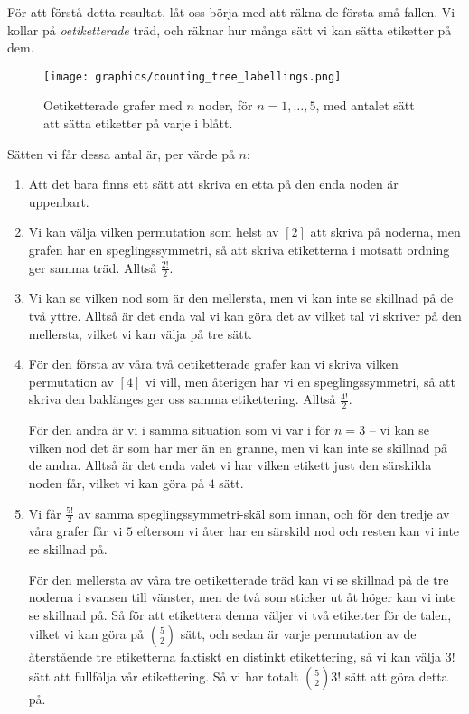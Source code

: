 \documentclass[nobib]{tufte-handout}
\begin{document}
För att förstå detta resultat, låt oss börja med att räkna de första små fallen. Vi kollar på \emph{oetiketterade} träd, och räknar hur många sätt vi kan sätta etiketter på dem.

\begin{figure}
    \centering
    \texttt{[image: graphics/counting\_tree\_labellings.png]}
    \caption{Oetiketterade grafer med $n$ noder, för $n = 1,\ldots,5$, med antalet sätt att sätta etiketter på varje i blått.}
\end{figure}

Sätten vi får dessa antal är, per värde på $n$:
\begin{enumerate}
    \item Att det bara finns ett sätt att skriva en etta på den enda noden är uppenbart.
    \item Vi kan välja vilken permutation som helst av $[2]$ att skriva på noderna, men grafen har en speglingssymmetri, så att skriva etiketterna i motsatt ordning ger samma träd. Alltså $\frac{2!}{2}$.
    \item Vi kan se vilken nod som är den mellersta, men vi kan inte se skillnad på de två yttre. Alltså är det enda val vi kan göra det av vilket tal vi skriver på den mellersta, vilket vi kan välja på tre sätt.
    \item För den första av våra två oetiketterade grafer kan vi skriva vilken permutation av $[4]$ vi vill, men återigen har vi en speglingssymmetri, så att skriva den baklänges ger oss samma etikettering. Alltså $\frac{4!}{2}$.
    
    För den andra är vi i samma situation som vi var i för $n=3$ -- vi kan se vilken nod det är som har mer än en granne, men vi kan inte se skillnad på de andra. Alltså är det enda valet vi har vilken etikett just den särskilda noden får, vilket vi kan göra på $4$ sätt.
    \item Vi får $\frac{5!}{2}$ av samma speglingssymmetri-skäl som innan, och för den tredje av våra grafer får vi $5$ eftersom vi åter har en särskild nod och resten kan vi inte se skillnad på.
    
    För den mellersta av våra tre oetiketterade träd kan vi se skillnad på de tre noderna i svansen till vänster, men de två som sticker ut åt höger kan vi inte se skillnad på. Så för att etikettera denna väljer vi två etiketter för de talen, vilket vi kan göra på $\binom{5}{2}$ sätt, och sedan är varje permutation av de återstående tre etiketterna faktiskt en distinkt etikettering, så vi kan välja $3!$ sätt att fullfölja vår etikettering. Så vi har totalt $\binom{5}{2}3!$ sätt att göra detta på.
\end{enumerate}
\end{document}
